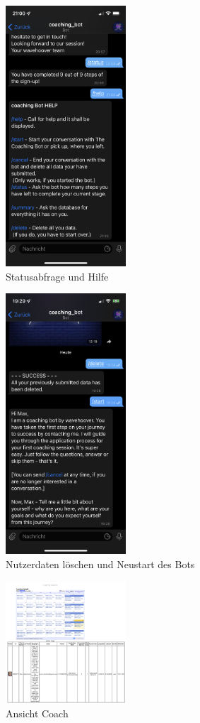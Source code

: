 	\begin{figure}
		\centering
		\includegraphics[width=0.4\textwidth]{images/Screenshots/status-and-help.PNG}
		\caption{Statusabfrage und Hilfe}
		\label{fig: scs..status-and-help}
	\end{figure}


	\begin{figure}
		\centering
		\includegraphics[width=0.4\textwidth]{images/Screenshots/delete-and-restart.PNG}
		\caption{Nutzerdaten löschen und Neustart des Bots}
		\label{fig: scs..delete-and-restart}
	\end{figure}


	\begin{figure}
		\centering
		\includegraphics[width=0.4\textwidth]{images/Screenshots/web-gui.png}
		\caption{Ansicht Coach}
		\label{fig: scs..web-gui}
	\end{figure}

